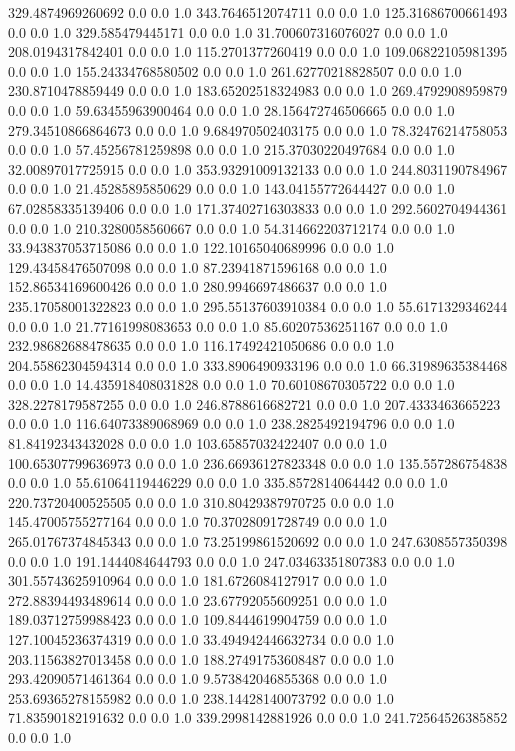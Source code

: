 329.4874969260692	0.0	0.0	1.0
343.7646512074711	0.0	0.0	1.0
125.31686700661493	0.0	0.0	1.0
329.585479445171	0.0	0.0	1.0
31.700607316076027	0.0	0.0	1.0
208.0194317842401	0.0	0.0	1.0
115.2701377260419	0.0	0.0	1.0
109.06822105981395	0.0	0.0	1.0
155.24334768580502	0.0	0.0	1.0
261.62770218828507	0.0	0.0	1.0
230.8710478859449	0.0	0.0	1.0
183.65202518324983	0.0	0.0	1.0
269.4792908959879	0.0	0.0	1.0
59.63455963900464	0.0	0.0	1.0
28.156472746506665	0.0	0.0	1.0
279.34510866864673	0.0	0.0	1.0
9.684970502403175	0.0	0.0	1.0
78.32476214758053	0.0	0.0	1.0
57.45256781259898	0.0	0.0	1.0
215.37030220497684	0.0	0.0	1.0
32.00897017725915	0.0	0.0	1.0
353.93291009132133	0.0	0.0	1.0
244.8031190784967	0.0	0.0	1.0
21.45285895850629	0.0	0.0	1.0
143.04155772644427	0.0	0.0	1.0
67.02858335139406	0.0	0.0	1.0
171.37402716303833	0.0	0.0	1.0
292.5602704944361	0.0	0.0	1.0
210.3280058560667	0.0	0.0	1.0
54.314662203712174	0.0	0.0	1.0
33.943837053715086	0.0	0.0	1.0
122.10165040689996	0.0	0.0	1.0
129.43458476507098	0.0	0.0	1.0
87.23941871596168	0.0	0.0	1.0
152.86534169600426	0.0	0.0	1.0
280.9946697486637	0.0	0.0	1.0
235.17058001322823	0.0	0.0	1.0
295.55137603910384	0.0	0.0	1.0
55.6171329346244	0.0	0.0	1.0
21.77161998083653	0.0	0.0	1.0
85.60207536251167	0.0	0.0	1.0
232.98682688478635	0.0	0.0	1.0
116.17492421050686	0.0	0.0	1.0
204.55862304594314	0.0	0.0	1.0
333.8906490933196	0.0	0.0	1.0
66.31989635384468	0.0	0.0	1.0
14.435918408031828	0.0	0.0	1.0
70.60108670305722	0.0	0.0	1.0
328.2278179587255	0.0	0.0	1.0
246.8788616682721	0.0	0.0	1.0
207.4333463665223	0.0	0.0	1.0
116.64073389068969	0.0	0.0	1.0
238.2825492194796	0.0	0.0	1.0
81.84192343432028	0.0	0.0	1.0
103.65857032422407	0.0	0.0	1.0
100.65307799636973	0.0	0.0	1.0
236.66936127823348	0.0	0.0	1.0
135.557286754838	0.0	0.0	1.0
55.61064119446229	0.0	0.0	1.0
335.8572814064442	0.0	0.0	1.0
220.73720400525505	0.0	0.0	1.0
310.80429387970725	0.0	0.0	1.0
145.47005755277164	0.0	0.0	1.0
70.37028091728749	0.0	0.0	1.0
265.01767374845343	0.0	0.0	1.0
73.25199861520692	0.0	0.0	1.0
247.6308557350398	0.0	0.0	1.0
191.1444084644793	0.0	0.0	1.0
247.03463351807383	0.0	0.0	1.0
301.55743625910964	0.0	0.0	1.0
181.6726084127917	0.0	0.0	1.0
272.88394493489614	0.0	0.0	1.0
23.67792055609251	0.0	0.0	1.0
189.03712759988423	0.0	0.0	1.0
109.8444619904759	0.0	0.0	1.0
127.10045236374319	0.0	0.0	1.0
33.494942446632734	0.0	0.0	1.0
203.11563827013458	0.0	0.0	1.0
188.27491753608487	0.0	0.0	1.0
293.42090571461364	0.0	0.0	1.0
9.573842046855368	0.0	0.0	1.0
253.69365278155982	0.0	0.0	1.0
238.14428140073792	0.0	0.0	1.0
71.83590182191632	0.0	0.0	1.0
339.2998142881926	0.0	0.0	1.0
241.72564526385852	0.0	0.0	1.0
